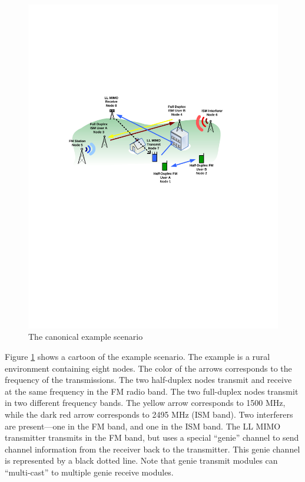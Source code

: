 \begin{figure}[h]
\centering
\includegraphics[width=6in]{figs/Canonical_Scenario}
\caption{The canonical example scenario}
\label{fig:canonicalEx}
\end{figure}

Figure \ref{fig:canonicalEx} shows a cartoon of the example
scenario. The example is a rural environment containing eight nodes.
The color of the arrows corresponds to the frequency of the
transmissions.  The two half-duplex nodes transmit and receive at
the same frequency in the FM radio band.  The two full-duplex nodes
transmit in two different frequency bands.  The yellow arrow
corresponds to 1500 MHz, while the dark red arrow corresponds to
2495 MHz (ISM band). Two interferers are present---one in the FM
band, and one in the ISM band. The LL MIMO transmitter transmits in
the FM band, but uses a special ``genie'' channel to send channel
information from the receiver back to the transmitter.  This genie
channel is represented by a black dotted line.  Note that genie transmit modules can ``multi-cast'' to multiple genie receive modules.

